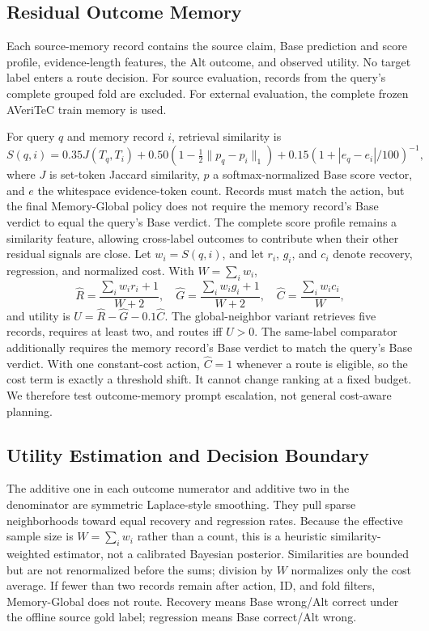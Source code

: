 \documentclass[runningheads]{llncs}
\begin{document}
\subsection{Residual Outcome Memory}

Each source-memory record contains the source claim, Base prediction and score
profile, evidence-length features, the Alt outcome, and observed utility. No
target label enters a route decision. For source evaluation, records from the
query's complete grouped fold are excluded. For external evaluation, the
complete frozen AVeriTeC train memory is used.

For query $q$ and memory record $i$, retrieval similarity is
\begin{equation}
S(q,i)=0.35J(T_q,T_i)+0.50\left(1-\tfrac12\lVert p_q-p_i\rVert_1\right)
+0.15\left(1+|e_q-e_i|/100\right)^{-1},
\end{equation}
where $J$ is set-token Jaccard similarity, $p$ a softmax-normalized Base score
vector, and $e$ the whitespace evidence-token count. Records must match the
action, but the final Memory-Global policy does not require the memory record's Base
verdict to equal the query's Base verdict. The complete score profile remains a
similarity feature, allowing cross-label outcomes to contribute when their
other residual signals are close. Let $w_i=S(q,i)$, and let $r_i$, $g_i$, and $c_i$
denote recovery, regression, and normalized cost. With $W=\sum_iw_i$,
\begin{equation}
\widehat R=\frac{\sum_iw_ir_i+1}{W+2},\quad
\widehat G=\frac{\sum_iw_ig_i+1}{W+2},\quad
\widehat C=\frac{\sum_iw_ic_i}{W},
\end{equation}
and utility is $U=\widehat R-\widehat G-0.1\widehat C$. The global-neighbor
variant retrieves five records, requires at least two, and routes iff $U>0$.
The same-label comparator additionally requires the memory record's Base verdict
to match the query's Base verdict. With one constant-cost action,
$\widehat C=1$ whenever a route is eligible, so the cost term is exactly a
threshold shift. It cannot change ranking at a fixed budget. We therefore test
outcome-memory prompt escalation, not general cost-aware planning.

\subsection{Utility Estimation and Decision Boundary}

The additive one in each outcome numerator and additive two in the denominator
are symmetric Laplace-style smoothing. They pull sparse neighborhoods toward
equal recovery and regression rates. Because the effective sample size is
$W=\sum_iw_i$ rather than a count, this is a heuristic similarity-weighted
estimator, not a calibrated Bayesian posterior. Similarities are bounded but
are not renormalized before the sums; division by $W$ normalizes only the cost
average. If fewer than two records remain after action, ID, and fold filters,
Memory-Global does not route. Recovery means Base wrong/Alt correct under
the offline source gold label; regression means Base correct/Alt wrong.
\end{document}
